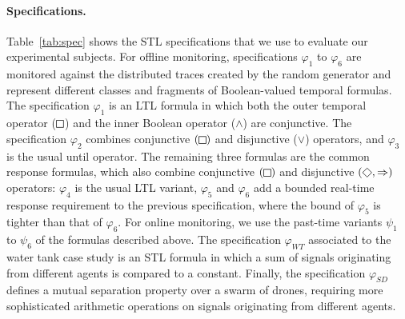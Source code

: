 \paragraph*{Specifications.}
Table~\ref{tab:spec} shows the STL specifications that we use to evaluate our experimental subjects.
For offline monitoring, specifications $\varphi_{1}$ to $\varphi_{6}$ are monitored against the distributed traces created by the random generator and represent different classes and fragments of Boolean-valued temporal formulas.
The specification $\varphi_1$ is an LTL formula in which both the outer temporal operator ($\LTLg$) and the inner Boolean operator ($\wedge$) are conjunctive.
The specification $\varphi_2$ combines conjunctive $(\LTLg)$ and disjunctive ($\lor$) operators, and $\varphi_3$ is the usual until operator.
The remaining three formulas are the common response formulas, which also combine conjunctive $(\LTLg)$ and disjunctive $(\LTLf, \Rightarrow)$ operators: $\varphi_4$ is the usual LTL variant, $\varphi_5$ and $\varphi_6$ add a bounded real-time response requirement to the previous specification, where the bound of $\varphi_5$ is tighter than that of $\varphi_6$.
For online monitoring, we use the past-time variants $\psi_1$ to $\psi_6$ of the formulas described above.
The specification $\varphi_{WT}$ associated to the water tank case study is an STL formula in which a sum of signals originating from different agents is compared to a constant. Finally, the specification $\varphi_{SD}$ defines a mutual separation property over a swarm of drones, requiring more sophisticated arithmetic operations on signals originating from different agents.


